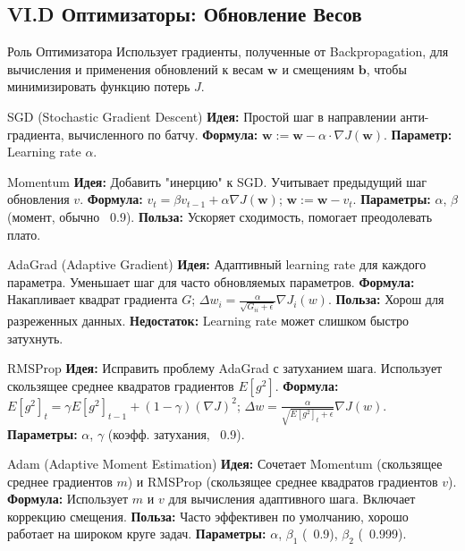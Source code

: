 \subsection{VI.D Оптимизаторы: Обновление Весов}

\begin{alerttextbox}{Роль Оптимизатора}
    Использует градиенты, полученные от Backpropagation, для вычисления и применения обновлений к весам $\mathbf{w}$ и смещениям $\mathbf{b}$, чтобы минимизировать функцию потерь $J$.
\end{alerttextbox}

\begin{myblock}{SGD (Stochastic Gradient Descent)}
    \textbf{Идея:} Простой шаг в направлении анти-градиента, вычисленного по батчу.
    \textbf{Формула:} $\mathbf{w} := \mathbf{w} - \alpha \cdot \nabla J(\mathbf{w})$.
    \textbf{Параметр:} Learning rate $\alpha$.
\end{myblock}

\begin{myblock}{Momentum}
    \textbf{Идея:} Добавить "инерцию" к SGD. Учитывает предыдущий шаг обновления $v$.
    \textbf{Формула:} $v_t = \beta v_{t-1} + \alpha \nabla J(\mathbf{w})$; $\mathbf{w} := \mathbf{w} - v_t$.
    \textbf{Параметры:} $\alpha$, $\beta$ (момент, обычно ~0.9).
    \textbf{Польза:} Ускоряет сходимость, помогает преодолевать плато.
\end{myblock}

\begin{myblock}{AdaGrad (Adaptive Gradient)}
    \textbf{Идея:} Адаптивный learning rate для каждого параметра. Уменьшает шаг для часто обновляемых параметров.
    \textbf{Формула:} Накапливает квадрат градиента $G$; $\Delta w_i = \frac{\alpha}{\sqrt{G_{ii} + \epsilon}} \nabla J_i(w)$.
    \textbf{Польза:} Хорош для разреженных данных.
    \textbf{Недостаток:} Learning rate может слишком быстро затухнуть.
\end{myblock}

\begin{myblock}{RMSProp}
    \textbf{Идея:} Исправить проблему AdaGrad с затуханием шага. Использует скользящее среднее квадратов градиентов $E[g^2]$.
    \textbf{Формула:} $E[g^2]_t = \gamma E[g^2]_{t-1} + (1-\gamma)(\nabla J)^2$; $\Delta w = \frac{\alpha}{\sqrt{E[g^2]_t + \epsilon}} \nabla J(w)$.
    \textbf{Параметры:} $\alpha$, $\gamma$ (коэфф. затухания, ~0.9).
\end{myblock}

\begin{myblock}{Adam (Adaptive Moment Estimation)}
    \textbf{Идея:} Сочетает Momentum (скользящее среднее градиентов $m$) и RMSProp (скользящее среднее квадратов градиентов $v$).
    \textbf{Формула:} Использует $m$ и $v$ для вычисления адаптивного шага. Включает коррекцию смещения.
    \textbf{Польза:} Часто эффективен по умолчанию, хорошо работает на широком круге задач.
    \textbf{Параметры:} $\alpha$, $\beta_1$ (~0.9), $\beta_2$ (~0.999).
\end{myblock}


